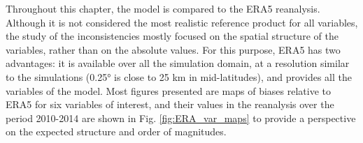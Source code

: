 \begin{table}[htbp]
    \centering
    \caption{Characteristics of simulations used in this chapter.}
    \label{table:coupled_simulations_chap4}
\end{table}

Throughout this chapter, the model is compared to the ERA5 reanalysis. Although it is not considered the most realistic reference product for all variables, the study of the inconsistencies mostly focused on the spatial structure of the variables, rather than on the absolute values.
For this purpose, ERA5 has two advantages: it is available over all the simulation domain, at a resolution similar to the simulations (0.25° is close to 25 km in mid-latitudes), and provides all the variables of the model.
Most figures presented are maps of biases relative to ERA5 for six variables of interest, and their values in the reanalysis over the period 2010-2014 are shown in Fig. \ref{fig:ERA_var_maps} to provide a perspective on the expected structure and order of magnitudes.

